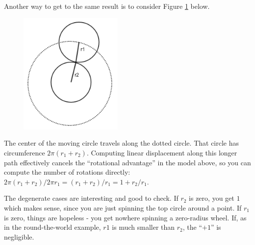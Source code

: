 \documentclass[11pt,a4paper]{report}
\theoremstyle{plain}
\theoremstyle{definition}
\theoremstyle{remark}
\begin{document}
\newpage 
Another way to get to the same result is to consider Figure \ref{fig:quarters} below.

\begin{figure}[h!]
  \includegraphics[width=2in]{quarters.png}
  \caption{}
  \label{fig:quarters}
\end{figure}

The center of the moving circle travels along the dotted circle. That circle has circumference $2\pi(r_1+r_2)$. Computing linear displacement along this longer path effectively cancels the ``rotational advantage'' in the model above, so you can compute the number of rotations directly: $2\pi(r_1+r_2) / 2{\pi}r_1 = (r_1 + r_2) / r_1 = 1 + r_2/r_1$.

The degenerate cases are interesting and good to check.  If $r_2$ is zero, you get $1$ which makes sense, since you are just spinning the top circle around a point.  If $r_1$ is zero, things are hopeless - you get nowhere spinning a zero-radius wheel. If, as in the round-the-world example, $r1$ is much smaller than $r_2$, the ``$+1$'' is negligible.
\end{document}
